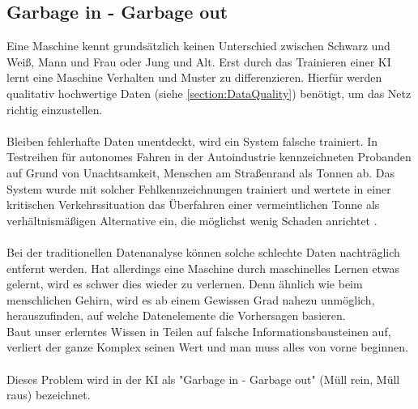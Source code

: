 \documentclass[12pt,oneside,a4paper,parskip]{scrbook}
\begin{document}
\subsection{Garbage in - Garbage out}
\label{section:DataGarbage}
Eine Maschine kennt grundsätzlich keinen Unterschied zwischen Schwarz und Weiß, Mann und Frau oder Jung und Alt. Erst durch das Trainieren einer KI lernt eine Maschine Verhalten und Muster zu differenzieren. Hierfür werden qualitativ hochwertige Daten (siehe \ref{section:DataQuality}) benötigt, um das Netz richtig einzustellen.
\\\\
Bleiben fehlerhafte Daten unentdeckt, wird ein System falsche trainiert. In Testreihen für autonomes Fahren in der Autoindustrie kennzeichneten Probanden auf Grund von Unachtsamkeit, Menschen am Straßenrand als Tonnen ab. Das System wurde mit solcher Fehlkennzeichnungen trainiert und wertete in einer kritischen Verkehrssituation das Überfahren einer vermeintlichen Tonne als verhältnismäßigen Alternative ein, die möglichst wenig Schaden anrichtet \cite{trainingsDataKI}.
\\\\
Bei der traditionellen Datenanalyse können solche schlechte Daten nachträglich entfernt werden. Hat allerdings eine Maschine durch maschinelles Lernen etwas gelernt, wird es schwer dies wieder zu verlernen. Denn ähnlich wie beim menschlichen Gehirn, wird es ab einem Gewissen Grad nahezu unmöglich, herauszufinden, auf welche Datenelemente die Vorhersagen basieren.\\
Baut unser erlerntes Wissen in Teilen auf falsche Informationsbausteinen auf, verliert der ganze Komplex seinen Wert und man muss alles von vorne beginnen.
\\\\
Dieses Problem wird in der KI als "Garbage in - Garbage out" (Müll rein, Müll raus) bezeichnet.
\end{document}
